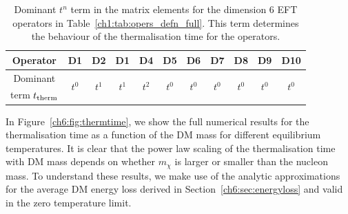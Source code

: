 \begin{table}[t!bp]
  \centering
  \begin{tabular}{c c c c c c c c c c c}
    \toprule
    Operator & D1 & D2 & D1 & D4 & D5 & D6 & D7 & D8 & D9 & D10\\
    \midrule\midrule
    Dominant & \multirow{2}{*}{$t^0$} & \multirow{2}{*}{$t^1$} & \multirow{2}{*}{$t^1$} & \multirow{2}{*}{$t^2$} & \multirow{2}{*}{$t^0$} & \multirow{2}{*}{$t^0$} & \multirow{2}{*}{$t^0$} & \multirow{2}{*}{$t^0$} & \multirow{2}{*}{$t^0$} & \multirow{2}{*}{$t^0$} \\
    term $t_{\rm therm}$ & & & & & & & & & &\\
    \bottomrule
  \end{tabular}
  \caption{Dominant $t^n$ term in the matrix elements for the dimension 6 EFT operators in Table~\ref{ch1:tab:opers_defn_full}. This term determines the behaviour of the thermalisation time for the operators.}
  \label{ch6:tab:dominanttn}
\end{table}


In Figure~\ref{ch6:fig:thermtime}, we show the full numerical results for the thermalisation time as a function of the DM mass for different equilibrium temperatures. It is clear that the power law scaling of the thermalisation time with DM mass depends on whether $m_\chi$ is larger or smaller than the nucleon mass. To understand these results, we make use of the analytic approximations for the average DM energy loss derived in Section~\ref{ch6:sec:energyloss} and valid in the zero temperature limit. 

